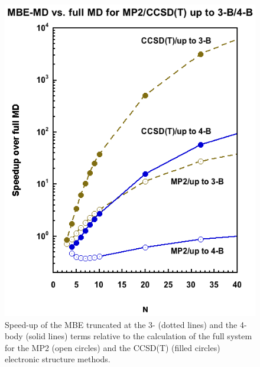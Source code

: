 \documentclass[11pt, proquest]{uwthesis}[2020/02/24]
\begin{document}
\begin{figure}[t]
\uwsinglespace
\begin{center}
\begin{minipage}{0.9\textwidth}
\includegraphics[width=\textwidth]{Figures/Chapter_4/ch4_figure_2.png}
\end{minipage}
\end{center}
\caption[Speed-up of the MBE truncated at the 3- (dotted lines) and the 4-body (solid lines) terms relative to the calculation of the full system for the MP2 (open circles) and the CCSD(T) (filled circles) electronic structure methods.]{Speed-up of the MBE truncated at the 3- (dotted lines) and the 4-body (solid lines) terms relative to the calculation of the full system for the MP2 (open circles) and the CCSD(T) (filled circles) electronic structure methods.}
\label{fig:MBE_MD_F2}
\end{figure}
\end{document}
